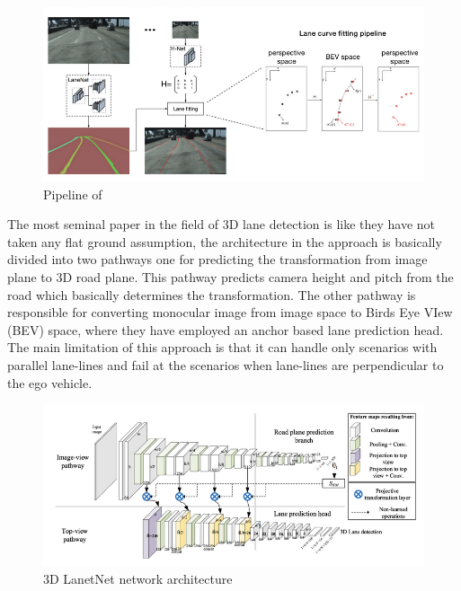  \begin{figure}[h]
    \centering
    \includegraphics[width=\textwidth]{images/lanenet.png}
    \caption{Pipeline of \cite{DBLP:journals/corr/abs-1802-05591}}
    \end{figure}


The most seminal paper in the field of 3D lane detection is \cite{DBLP:journals/corr/abs-1811-10203} like \cite{DBLP:journals/corr/abs-1802-05591} they have not taken any flat ground assumption, the architecture in the approach is basically divided into two pathways one for predicting the transformation from image plane to 3D road plane. This pathway predicts camera height and pitch from the road which basically determines the transformation. The other pathway is responsible for converting monocular image from image space to Birds Eye VIew (BEV) space, where they have employed an anchor based lane prediction head. The main limitation of this approach is that it can handle only scenarios with parallel lane-lines and fail at the scenarios when lane-lines are perpendicular to the ego vehicle. 

\begin{figure}[h]
    \centering
    \includegraphics[width=\textwidth]{images/3dlanenet.png}
    \caption{\cite{DBLP:journals/corr/abs-1811-10203} 3D LanetNet network architecture}
    \end{figure}

